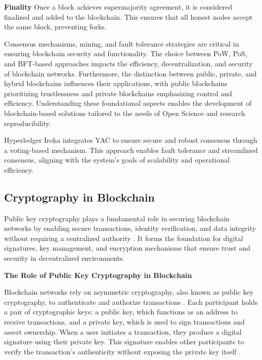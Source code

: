\documentclass[final]{rc-book-2.14}
\begin{document}
\textbf{Finality}
Once a block achieves supermajority agreement, it is considered finalized and added to the blockchain. This ensures that all honest nodes accept the same block, preventing forks.

Consensus mechanisms, mining, and fault tolerance strategies are critical in ensuring blockchain security and functionality. The choice between PoW, PoS, and BFT-based approaches impacts the efficiency, decentralization, and security of blockchain networks. Furthermore, the distinction between public, private, and hybrid blockchains influences their applications, with public blockchains prioritizing trustlessness and private blockchains emphasizing control and efficiency. Understanding these foundational aspects enables the development of blockchain-based solutions tailored to the needs of Open Science and research reproducibility.

Hyperledger Iroha integrates YAC to ensure secure and robust consensus through a voting-based mechanism. This approach enables fault tolerance and streamlined consensus, aligning with the system's goals of scalability and operational efficiency.


\subsection{Cryptography in Blockchain}

Public key cryptography plays a fundamental role in securing blockchain networks by enabling secure transactions, identity verification, and data integrity without requiring a centralized authority \cite{narayanan2016bitcoin}. It forms the foundation for digital signatures, key management, and encryption mechanisms that ensure trust and security in decentralized environments.

\textbf{The Role of Public Key Cryptography in Blockchain}

Blockchain networks rely on asymmetric cryptography, also known as public key cryptography, to authenticate and authorize transactions \cite{rivest1978method}. Each participant holds a pair of cryptographic keys: a public key, which functions as an address to receive transactions, and a private key, which is used to sign transactions and assert ownership. When a user initiates a transaction, they produce a digital signature using their private key. This signature enables other participants to verify the transaction’s authenticity without exposing the private key itself \cite{menezes1996handbook}.
\end{document}
